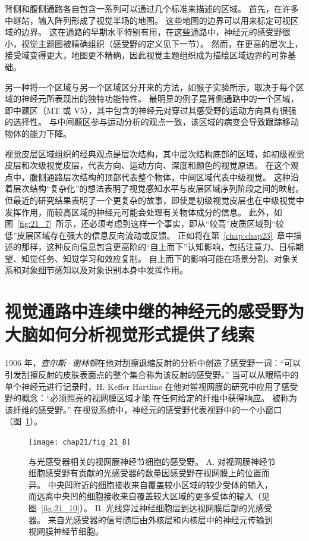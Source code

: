 背侧和腹侧通路各自包含一系列可以通过几个标准来描述的区域。
首先，在许多中继站，输入阵列形成了视觉半场的地图。 
这些地图的边界可以用来标定可视区域的边界。
这在通路的早期水平特别有用，在这些通路中，神经元的感受野很小，视觉主题图被精确组织（感受野的定义见下一节）。
然而，在更高的层次上，接受域变得更大，地图更不精确，因此视觉主题组织成为描绘区域边界的可靠基础。


另一种将一个区域与另一个区域区分开来的方法，如猴子实验所示，取决于每个区域的神经元所表现出的独特功能特性。
最明显的例子是背侧通路中的一个区域，即中颞区（MT 或 V5），其中包含的神经元对穿过其感受野的运动方向具有很强的选择性。
与中间颞区参与运动分析的观点一致，该区域的病变会导致跟踪移动物体的能力下降。


视觉皮层区域组织的经典观点是层次结构，其中层次结构底部的区域，如初级视觉皮层和次级视觉皮层，代表方向、运动方向、深度和颜色的视觉原语。
在这个观点中，腹侧通路层次结构的顶部代表整个物体，中间区域代表中级视觉。
这种沿着层次结构“复杂化”的想法表明了视觉感知水平与皮层区域序列阶段之间的映射。
但最近的研究结果表明了一个更复杂的故事，即使是初级视觉皮层也在中级视觉中发挥作用，而较高区域的神经元可能会处理有关物体成分的信息。
此外，如图~\ref{fig:21_7}~所示，还必须考虑到这样一个事实，即从“较高”皮质区域到“较低”皮层区域存在强大的信息反向流动或反馈。
正如将在第~\ref{chap:chap23}~章中描述的那样，这种反向信息包含更高阶的“自上而下”认知影响，包括注意力、目标期望、知觉任务、知觉学习和效应复制。
自上而下的影响可能在场景分割、对象关系和对象细节感知以及对象识别本身中发挥作用。



\section{视觉通路中连续中继的神经元的感受野为大脑如何分析视觉形式提供了线索}

1906 年，\textit{查尔斯·谢林顿}在他对刮擦退缩反射的分析中创造了感受野一词：“可以引发刮擦反射的皮肤表面点的整个集合称为该反射的感受野。” 
当可以从眼睛中的单个神经元进行记录时，H. Keffer Hartline 在他对鲎视网膜的研究中应用了感受野的概念：“必须照亮的视网膜区域才能 在任何给定的纤维中获得响应。
被称为该纤维的感受野。” 
在视觉系统中，神经元的感受野代表视野中的一个小窗口（图~\ref{fig:21_8}）。


\begin{figure}[htbp]
	\centering
	\texttt{[image: chap21/fig\_21\_8]}
	\caption{与光感受器相关的视网膜神经节细胞的感受野。
		A. 对视网膜神经节细胞感受野有贡献的光感受器的数量因感受野在视网膜上的位置而异。
		中央凹附近的细胞接收来自覆盖较小区域的较少受体的输入，而远离中央凹的细胞接收来自覆盖较大区域的更多受体的输入（见图~\ref{fig:21_10}）。
		B. 光线穿过神经细胞层到达视网膜后部的光感受器。
		来自光感受器的信号随后由外核层和内核层中的神经元传输到视网膜神经节细胞。}
	\label{fig:21_8}
\end{figure}



